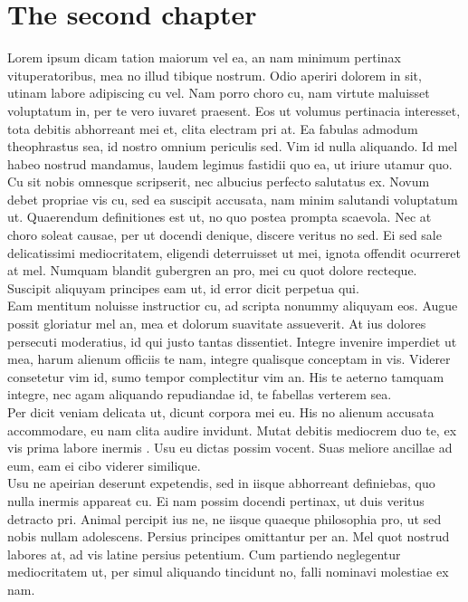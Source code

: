 \chapter{The second chapter}

Lorem ipsum dicam tation maiorum vel ea, an nam minimum pertinax vituperatoribus, mea no illud tibique nostrum. Odio aperiri dolorem in sit, utinam labore adipiscing cu vel. Nam porro choro cu, nam virtute maluisset voluptatum in, per te vero iuvaret praesent. Eos ut volumus pertinacia interesset, tota debitis abhorreant mei et, clita electram pri at. Ea fabulas admodum theophrastus sea, id nostro omnium periculis sed. Vim id nulla aliquando. Id mel habeo nostrud mandamus, laudem legimus fastidii quo ea, ut iriure utamur quo.\\

Cu sit nobis omnesque scripserit, nec albucius perfecto salutatus ex. Novum debet propriae vis cu, sed ea suscipit accusata, nam minim salutandi voluptatum ut. Quaerendum definitiones est ut, no quo postea prompta scaevola. Nec at choro soleat causae, per ut docendi denique, discere veritus no sed. Ei sed sale delicatissimi  mediocritatem, eligendi deterruisset ut mei, ignota offendit ocurreret at mel. Numquam blandit gubergren an pro, mei cu quot dolore recteque. Suscipit aliquyam principes eam ut, id error dicit perpetua qui.\\

Eam mentitum noluisse instructior cu, ad scripta nonummy aliquyam eos. Augue possit gloriatur mel an, mea et dolorum suavitate assueverit. At ius dolores persecuti moderatius, id qui justo tantas dissentiet. Integre invenire imperdiet ut mea, harum alienum officiis te nam, integre qualisque conceptam in vis. Viderer  consetetur vim id, sumo tempor complectitur vim an. His te aeterno tamquam integre, nec agam aliquando repudiandae id, te fabellas verterem sea.\\

Per dicit veniam delicata ut, dicunt corpora mei eu. His no alienum accusata accommodare, eu nam clita audire invidunt. Mutat debitis mediocrem duo te, ex vis prima labore inermis \cite{Aly2012}. Usu eu dictas possim vocent. Suas meliore ancillae ad eum, eam ei cibo viderer similique.\\

Usu ne apeirian deserunt expetendis, sed in iisque abhorreant definiebas, quo nulla inermis appareat cu. Ei nam possim docendi pertinax, ut duis veritus detracto pri. Animal percipit ius ne, ne iisque quaeque philosophia pro, ut sed nobis nullam adolescens. Persius principes omittantur per an. Mel quot nostrud labores at, ad vis latine persius petentium. Cum partiendo neglegentur mediocritatem ut, per simul aliquando tincidunt no, falli nominavi molestiae ex nam.\\

